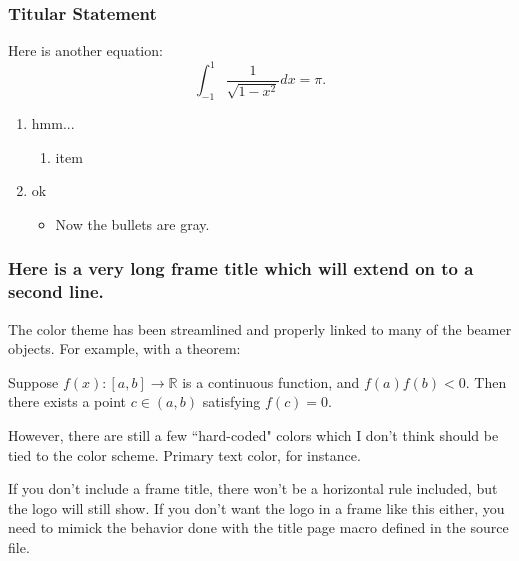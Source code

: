 \documentclass{beamer}
\begin{document}
\begin{frame}
\frametitle{Titular Statement}
Here is another equation:
%
\begin{equation}
\int_{-1}^1 \frac{1}{\sqrt{1-x^2}} dx = \pi.
\end{equation}

\begin{enumerate}
\item hmm...
    \begin{enumerate}
    \item item
    \end{enumerate}
\item ok
    \begin{itemize}
    \item Now the bullets are gray.
    \end{itemize}
\end{enumerate}

\end{frame}
%
\begin{frame}
\frametitle{Here is a very long frame title which 
will extend on to a second line. }

The color theme has been streamlined and properly linked 
to many of the beamer objects. For example, with a 
theorem:

\begin{theorem}
Suppose $f(x) : [a,b] \to \mathbb{R}$ is a 
continuous function, and $f(a)f(b)<0$. Then 
there exists a point $c \in (a,b)$ satisfying 
$f(c)=0$.
\end{theorem}

However, there are still a few ``hard-coded" colors which 
I don't think should be tied to the color scheme. 
Primary text color, for instance.

\end{frame}
%
\begin{frame}
If you don't include a frame title, there won't be a horizontal 
rule included, but the logo will still show. 
If you don't want the logo in a frame like this 
either, you need to mimick the behavior done with the 
title page macro defined in the source file.
\end{frame}
%
\end{document}
